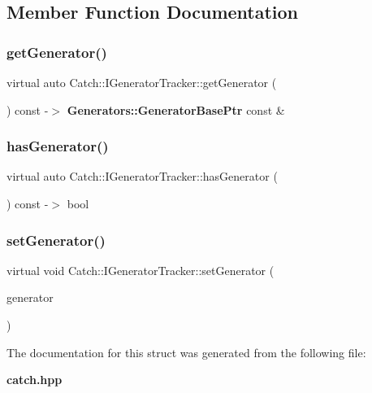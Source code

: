 \subsection{Member Function Documentation}
\mbox{\label{struct_catch_1_1_i_generator_tracker_a23be942fc51672598bfa02c678c3078a}} 
\subsubsection{getGenerator()}
{\footnotesize\ttfamily virtual auto Catch\+::\+I\+Generator\+Tracker\+::get\+Generator (\begin{DoxyParamCaption}{ }\end{DoxyParamCaption}) const -\/$>$  \textbf{ Generators\+::\+Generator\+Base\+Ptr} const \&\hspace{0.3cm}{\ttfamily [pure virtual]}}

\mbox{\label{struct_catch_1_1_i_generator_tracker_ae88084f9af27c8b9a5d5775b9c148498}} 
\subsubsection{hasGenerator()}
{\footnotesize\ttfamily virtual auto Catch\+::\+I\+Generator\+Tracker\+::has\+Generator (\begin{DoxyParamCaption}{ }\end{DoxyParamCaption}) const -\/$>$  bool\hspace{0.3cm}{\ttfamily [pure virtual]}}

\mbox{\label{struct_catch_1_1_i_generator_tracker_a9945eff42219edc5a7071eebd8b0419e}} 
\subsubsection{setGenerator()}
{\footnotesize\ttfamily virtual void Catch\+::\+I\+Generator\+Tracker\+::set\+Generator (\begin{DoxyParamCaption}\item[{\textbf{ Generators\+::\+Generator\+Base\+Ptr} \&\&}]{generator }\end{DoxyParamCaption})\hspace{0.3cm}{\ttfamily [pure virtual]}}



The documentation for this struct was generated from the following file\+:\begin{DoxyCompactItemize}
\item 
\textbf{ catch.\+hpp}\end{DoxyCompactItemize}
